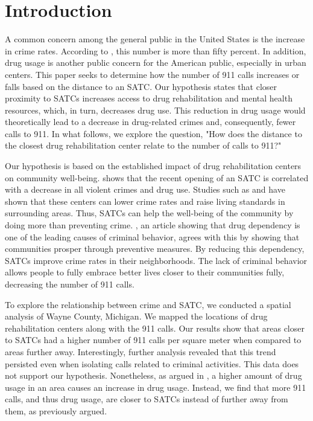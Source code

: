 \documentclass[12pt]{article}
\begin{document}
\section{Introduction} \label{sec:introduction}
A common concern among the general public in the United States is the increase in crime rates. According to \cite{covid_and_crime}, this number is more than fifty percent. In addition, drug usage is another public concern for the American public, especially in urban centers. This paper seeks to determine how the number of 911 calls increases or falls based on the distance to an SATC. Our hypothesis states that closer proximity to SATCs increases access to drug rehabilitation and mental health resources, which, in turn, decreases drug use. This reduction in drug usage would theoretically lead to a decrease in drug-related crimes and, consequently, fewer calls to 911. In what follows, we explore the question, "How does the distance to the closest drug rehabilitation center relate to the number of calls to 911?" 

Our hypothesis is based on the established impact of drug rehabilitation centers on community well-being. \cite{SAT_centers_and_crime} shows that the recent opening of an SATC is correlated with a decrease in all violent crimes and drug use. Studies such as \cite{drugs_and_crime}
and \cite{drugs_crime_space_time} have shown that these centers can lower crime rates and raise living standards in surrounding areas. Thus, SATCs can help the well-being of the community by doing more than preventing crime. \cite{mental_healthcare_and_crime}, an article showing that drug dependency is one of the leading causes of criminal behavior, agrees with this by showing that communities prosper through preventive measures. By reducing this dependency, SATCs improve crime rates in their neighborhoods. The lack of criminal behavior allows people to fully embrace better lives closer to their communities fully, decreasing the number of 911 calls. 

To explore the relationship between crime and SATC, we conducted a spatial analysis of Wayne County, Michigan. We mapped the locations of drug rehabilitation centers along with the 911 calls. Our results show that areas closer to SATCs had a higher number of 911 calls per square meter when compared to areas further away. Interestingly, further analysis revealed that this trend persisted even when isolating calls related to criminal activities. This data does not support our hypothesis. Nonetheless, as argued in \cite{Socioeconomic-Determinants}, a higher amount of drug usage in an area causes an increase in drug usage. Instead, we find that more 911 calls, and thus drug usage, are closer to SATCs instead of further away from them, as previously argued. 
\end{document}
